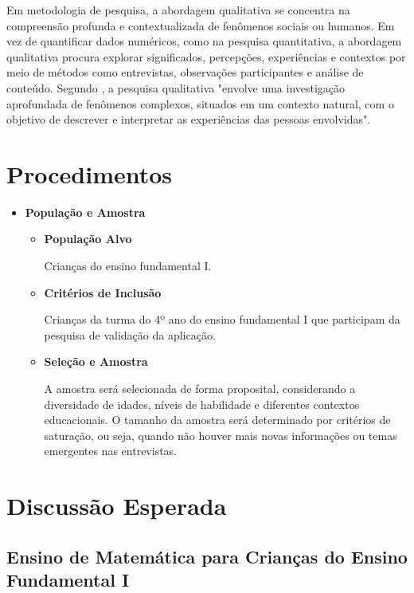 Em metodologia de pesquisa, a abordagem qualitativa se concentra na compreensão profunda e contextualizada de fenômenos sociais ou humanos. Em vez de quantificar dados numéricos, como na pesquisa quantitativa, a abordagem qualitativa procura explorar significados, percepções, experiências e contextos por meio de métodos como entrevistas, observações participantes e análise de conteúdo. Segundo \cite{creswell2013research}, a pesquisa qualitativa "envolve uma investigação aprofundada de fenômenos complexos, situados em um contexto natural, com o objetivo de descrever e interpretar as experiências das pessoas envolvidas". 


\section{Procedimentos}

\begin{itemize}
    \item \textbf{População e Amostra}
    
    \begin{itemize}
    
        \item \textbf{População Alvo}
    
        Crianças do ensino fundamental I.

        \item \textbf{Critérios de Inclusão}

        Crianças da turma do 4º ano do ensino fundamental I que participam da pesquisa de validação da aplicação.


        \item \textbf{Seleção e Amostra}

    A amostra será selecionada de forma proposital, considerando a diversidade de idades, níveis de habilidade e diferentes contextos educacionais. O tamanho da amostra será determinado por critérios de saturação, ou seja, quando não houver mais novas informações ou temas emergentes nas entrevistas.
    \end{itemize}

    
\end{itemize}

\section{Discussão Esperada}

\subsection{Ensino de Matemática para Crianças do Ensino Fundamental I}

